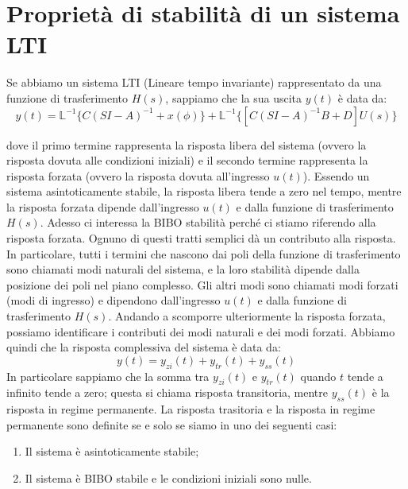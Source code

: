 \section{Proprietà di stabilità di un sistema LTI}
Se abbiamo un sistema LTI (Lineare tempo invariante) rappresentato da una
funzione di trasferimento $H(s)$, sappiamo che la sua uscita $y(t)$ è data da:
\begin{equation}
    y(t) = \mathbb{L}^{-1}\{C(SI -A)^{-1} + x(\phi)\}+ \mathbb{L}^{-1}\{[C(SI -A)^{-1}B + D]U(s)\}
\end{equation}

dove il primo termine rappresenta la risposta libera del sistema (ovvero la
risposta dovuta alle condizioni iniziali) e il secondo termine rappresenta la
risposta forzata (ovvero la risposta dovuta all'ingresso $u(t)$). Essendo un
sistema asintoticamente stabile, la risposta libera tende a zero nel tempo,
mentre la risposta forzata dipende dall'ingresso $u(t)$ e dalla funzione di
trasferimento $H(s)$. Adesso ci interessa la BIBO stabilità perché ci stiamo
riferendo alla risposta forzata. Ognuno di questi tratti semplici dà un
contributo alla risposta. In particolare, tutti i termini che nascono dai poli
della funzione di trasferimento sono chiamati modi naturali del sistema, e la
loro stabilità dipende dalla posizione dei poli nel piano complesso. Gli altri
modi sono chiamati modi forzati (modi di ingresso) e dipendono dall'ingresso
$u(t)$ e dalla funzione di trasferimento $H(s)$. Andando a scomporre
ulteriormente la risposta forzata, possiamo identificare i contributi dei modi
naturali e dei modi forzati. Abbiamo quindi che la risposta complessiva del
sistema è data da:
\begin{equation}
    y(t) = y_{zi}(t) + y_{tr}(t) + y_{ss}(t)
\end{equation}
In particolare sappiamo che la somma tra $y_{zi}(t)$ e $y_{tr}(t)$ quando $t$ tende a infinito tende a zero; questa si chiama risposta transitoria, mentre $y_{ss}(t)$ è la risposta in regime permanente.
La risposta trasitoria e la risposta in regime permanente sono definite se e solo se siamo in uno dei seguenti casi:
\begin{enumerate}
    \item Il sistema è asintoticamente stabile;
    \item Il sistema è BIBO stabile e le condizioni iniziali sono nulle.
\end{enumerate}

